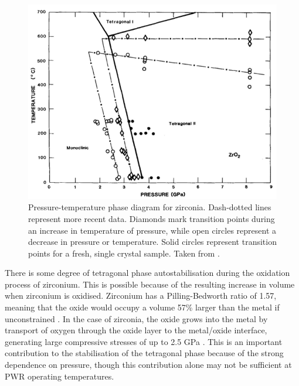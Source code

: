 \begin{figure}[ht]
  \centering
      \includegraphics[width=13cm]{images/zirconiaphasediagram.png}
  \caption[Pressure-temperature phase diagram for zirconia. Dash-dotted lines represent more recent data. Diamonds mark transition points during an increase in temperature of pressure, while open circles represent a decrease in pressure or temperature. Solid circles represent transition points for a fresh, single crystal sample.]{Pressure-temperature phase diagram for zirconia. Dash-dotted lines represent more recent data. Diamonds mark transition points during an increase in temperature of pressure, while open circles represent a decrease in pressure or temperature. Solid circles represent transition points for a fresh, single crystal sample. Taken from \cite{block1985pressure}. \label{fig:phasediagram}}
\end{figure}


There is some degree of tetragonal phase autostabilisation during the oxidation process of zirconium. This is possible because of the resulting increase in volume when zirconium is oxidised. Zirconium has a Pilling-Bedworth ratio of 1.57, meaning that the oxide would occupy a volume 57\% larger than the metal if unconstrained \cite{cramer2003corrosion, Pilling1923}. In the case of zirconia, the oxide grows into the metal by transport of oxygen through the oxide layer to the metal/oxide interface, generating large compressive stresses of up to 2.5 GPa \cite{Petigny2000, garzarolli1991oxide, preuss2011studies}. This is an important contribution to the stabilisation of the tetragonal phase because of the strong dependence on pressure, though this contribution alone may not be sufficient at PWR operating temperatures.

